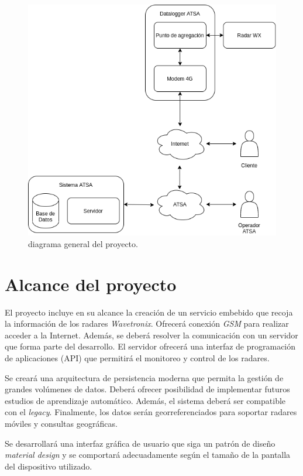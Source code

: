 \documentclass[
12pt,
spanish,
singlespacing,
parskip,
headsepline,]{article}
\begin{document}
\begin{figure}[h!]
	\centering
	\includegraphics[width=\textwidth]{Figuras/diagramaGeneral.png}
	\caption{diagrama general del proyecto.}
	\label{fig:general}
\end{figure}

\section{Alcance del proyecto}

El proyecto incluye en su alcance la creación de un servicio embebido que recoja la información de los radares \emph{Wavetronix}.
Ofrecerá conexión \emph{GSM} para realizar acceder a la Internet.
Además, se deberá resolver la comunicación con un servidor que forma parte del desarrollo.
El servidor ofrecerá una interfaz de programación de aplicaciones (API) que permitirá el monitoreo y control de los radares.

Se creará una arquitectura de persistencia moderna que permita la gestión de grandes volúmenes de datos.
Deberá ofrecer posibilidad de implementar futuros estudios de aprendizaje automático.
Además, el sistema deberá ser compatible con el \emph{legacy}.
Finalmente, los datos serán georreferenciados para soportar radares móviles y consultas geográficas.

Se desarrollará una interfaz gráfica de usuario que siga un patrón de diseño \emph{material design} y se comportará adecuadamente según el tamaño de la pantalla del dispositivo utilizado.
\end{document}
